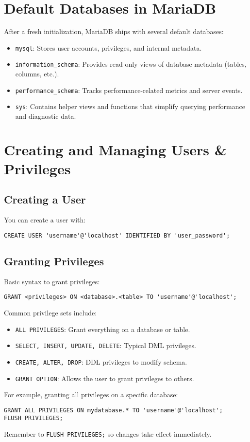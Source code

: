 \documentclass[10pt]{article}
\begin{document}
\section{Default Databases in MariaDB}
After a fresh initialization, MariaDB ships with several default databases:
\begin{itemize}
    \item \texttt{mysql}: Stores user accounts, privileges, and internal metadata.
    \item \texttt{information\_schema}: Provides read-only views of database metadata (tables, columns, etc.).
    \item \texttt{performance\_schema}: Tracks performance-related metrics and server events.
    \item \texttt{sys}: Contains helper views and functions that simplify querying performance and diagnostic data.
\end{itemize}

\section{Creating and Managing Users \& Privileges}
\subsection{Creating a User}
You can create a user with:
\begin{lstlisting}
CREATE USER 'username'@'localhost' IDENTIFIED BY 'user_password';
\end{lstlisting}

\subsection{Granting Privileges}
Basic syntax to grant privileges:
\begin{lstlisting}
GRANT <privileges> ON <database>.<table> TO 'username'@'localhost';
\end{lstlisting}
Common privilege sets include:
\begin{itemize}
    \item \texttt{ALL PRIVILEGES}: Grant everything on a database or table.
    \item \texttt{SELECT, INSERT, UPDATE, DELETE}: Typical DML privileges.
    \item \texttt{CREATE, ALTER, DROP}: DDL privileges to modify schema.
    \item \texttt{GRANT OPTION}: Allows the user to grant privileges to others.
\end{itemize}
For example, granting all privileges on a specific database:
\begin{lstlisting}
GRANT ALL PRIVILEGES ON mydatabase.* TO 'username'@'localhost';
FLUSH PRIVILEGES;
\end{lstlisting}
Remember to \texttt{FLUSH PRIVILEGES;} so changes take effect immediately.
\end{document}
